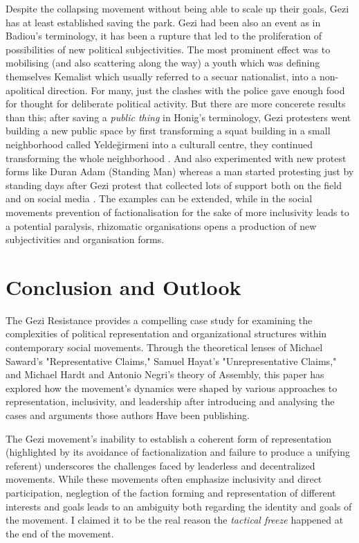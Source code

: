 Despite the collapsing movement without being able to scale up their goals, Gezi
has at least established saving the park. Gezi had been also an event as in Badiou's terminology, it has been a
rupture that led to the proliferation of
possibilities of new political subjectivities. The most prominent effect was to
mobilising (and also scattering along the way) a youth which was defining
themselves Kemalist which usually referred to a secuar nationalist, into a
non-apolitical direction. For many, just the clashes with the police gave enough
food for thought for deliberate political activity. But there are more
concerete results than this; after saving a \textit{public thing} in Honig's
terminology, Gezi protesters went building a new public space by first
transforming a squat building in a small neighborhood called Yeldeğirmeni into a
culturall centre, they continued transforming the whole neighborhood
\parencite[see for example]{durgun2021}. And also experimented with new protest
forms like Duran Adam (Standing Man) whereas a man started protesting just by
standing days after Gezi protest that collected lots of support both on the
field and on social media \parencite[see for example]{verstraete2013}. The
examples can be extended, while in the social movements prevention of
factionalisation for the sake of more inclusivity leads to a potential
paralysis, rhizomatic organisations opens a production of new subjectivities and
organisation forms.


\chapter{Conclusion and Outlook}

The Gezi Resistance provides a compelling case study for examining the complexities of political representation and organizational structures within contemporary social movements. Through the theoretical lenses of Michael Saward's "Representative Claims," Samuel Hayat's "Unrepresentative Claims," and Michael Hardt and Antonio Negri's theory of Assembly, this paper has explored how the movement's dynamics were shaped by various approaches to representation, inclusivity, and leadership after introducing and analysing the cases and arguments those authors Have been publishing.

The Gezi movement’s inability to establish a coherent form of representation (highlighted by its avoidance of factionalization and failure to produce a unifying referent) underscores the challenges faced by leaderless and decentralized movements. While these movements often emphasize inclusivity and direct participation, neglegtion of the faction forming and representation of different interests and goals leads to an ambiguity both regarding the identity and goals of the movement. I claimed it to be the real reason the \textit{tactical freeze} happened at the end of the movement.

